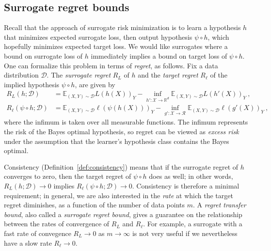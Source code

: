 \documentclass[twoside,11pt]{article}
\newcommand{\reals}{\mathbb{R}}
\newcommand{\D}{\mathcal{D}}
\newcommand{\E}{\mathbb{E}}
\newcommand{\R}{\mathcal{R}}
\newcommand{\X}{\mathcal{X}}
\begin{document}
\subsection{Surrogate regret bounds}\label{subsec:regret-bounds}
Recall that the approach of surrogate risk minimization is to learn a hypothesis $h$ that minimizes expected surrogate loss, then output hypothesis $\psi \circ h$, which hopefully minimizes expected target loss.
We would like surrogates where a bound on surrogate loss of $h$ immediately implies a bound on target loss of $\psi \circ h$.
One can formalize this problem in terms of \emph{regret}, as follows.
Fix a data distribution $\D$.
The \emph{surrogate regret} $R_L$ of $h$ and the \emph{target regret} $R_{\ell}$ of the implied hypothesis $\psi \circ h$, are given by
\begin{align*}
  R_L(h;\D) &= \E_{(X,Y)\sim\D} L(h(X))_Y - \inf_{h':\X\to\reals^d} \E_{(X,Y)\sim\D} L(h'(X))_Y~,
  \\
  R_\ell(\psi\circ h;\D) &= \E_{(X,Y)\sim\D} \ell(\psi(h(X)))_Y - \inf_{g':\X\to\R} \E_{(X,Y)\sim\D} \ell(g'(X))_Y~,
\end{align*}
where the infimum is taken over all measurable functions.
The infimum represents the risk of the Bayes optimal hypothesis, so regret can be viewed as \emph{excess risk} under the assumption that the learner's hypothesis class contains the Bayes optimal.

Consistency (Definition~\ref{def:consistency}) means that if the surrogate regret of $h$ converges to zero, then the target regret of $\psi \circ h$ does as well; in other words, $R_L(h;\D) \to 0$ implies $R_{\ell}(\psi \circ h;\D) \to 0$.
Consistency is therefore a minimal requirement; in general, we are also interested in the \emph{rate} at which the target regret diminishes, as a function of the number of data points $m$.
A \emph{regret transfer bound}, also called a \emph{surrogate regret bound}, gives a guarantee on the relationship between the rates of convergence of $R_L$ and $R_{\ell}$.
For example, a surrogate with a fast rate of convegence $R_L \to 0$ as $m \to \infty$ is not very useful if we nevertheless have a slow rate $R_{\ell} \to 0$.
\end{document}
